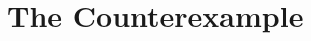 \documentclass[12pt,\papersize]{extarticle}
\begin{document}
%
%
%
%
%
%
%
%
%


%



\section{The Counterexample}
\label{sec:the_counterexample}
\end{document}
